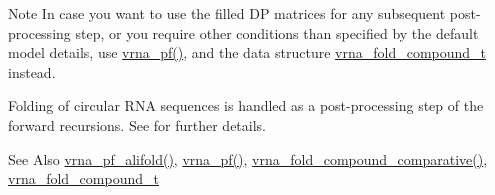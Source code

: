 \begin{DoxyNote}{Note}
In case you want to use the filled D\-P matrices for any subsequent post-\/processing step, or you require other conditions than specified by the default model details, use \hyperlink{group__pf__fold_ga29e256d688ad221b78d37f427e0e99bc}{vrna\-\_\-pf()}, and the data structure \hyperlink{group__fold__compound_ga1b0cef17fd40466cef5968eaeeff6166}{vrna\-\_\-fold\-\_\-compound\-\_\-t} instead.
\end{DoxyNote}
Folding of circular R\-N\-A sequences is handled as a post-\/processing step of the forward recursions. See \cite{hofacker:2006} for further details.

\begin{DoxySeeAlso}{See Also}
\hyperlink{group__consensus__pf__fold_gaef750636c70e597a85ee139197a4350d}{vrna\-\_\-pf\-\_\-alifold()}, \hyperlink{group__pf__fold_ga29e256d688ad221b78d37f427e0e99bc}{vrna\-\_\-pf()}, \hyperlink{group__fold__compound_gad6bacc816af274922b13d947f708aa0c}{vrna\-\_\-fold\-\_\-compound\-\_\-comparative()}, \hyperlink{group__fold__compound_ga1b0cef17fd40466cef5968eaeeff6166}{vrna\-\_\-fold\-\_\-compound\-\_\-t}
\end{DoxySeeAlso}

